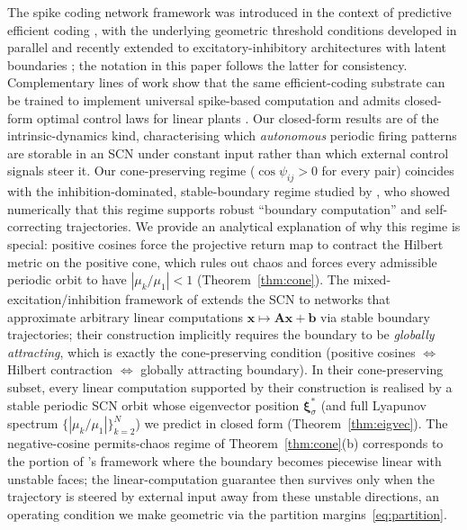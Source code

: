 \documentclass[12pt]{article}
\newcommand{\vv}[1]{\mathbf{#1}}
\newcommand{\xx}{\vv{x}}
\newcommand{\xxi}{\boldsymbol{\xi}}
\begin{document}
 The spike coding network framework was introduced in the context of predictive efficient coding \citep{boerlin2011spike,boerlin2013predictive,deneve2016efficient}, with the underlying geometric threshold conditions developed in parallel \citep{barrett2013firing,chalk2016neural} and recently extended to excitatory-inhibitory architectures with latent boundaries \citep{podlaski2024approximating}; the notation in this paper follows the latter for consistency. Complementary lines of work show that the same efficient-coding substrate can be trained to implement universal spike-based computation \citep{thalmeier2016spikes} and admits closed-form optimal control laws for linear plants \citep{slijkhuis2024closedform}. Our closed-form results are of the intrinsic-dynamics kind, characterising which \emph{autonomous} periodic firing patterns are storable in an SCN under constant input rather than which external control signals steer it. Our cone-preserving regime ($\cos\psi_{ij}>0$ for every pair) coincides with the inhibition-dominated, stable-boundary regime studied by \citet{calaim2022geometry}, who showed numerically that this regime supports robust ``boundary computation'' and self-correcting trajectories. We provide an analytical explanation of why this regime is special: positive cosines force the projective return map to contract the Hilbert metric on the positive cone, which rules out chaos and forces every admissible periodic orbit to have $|\mu_k/\mu_1|<1$ (Theorem~\ref{thm:cone}). The mixed-excitation/inhibition framework of \citet{podlaski2024approximating} extends the SCN to networks that approximate arbitrary linear computations $\xx\mapsto\vv{A}\xx + \vv{b}$ via stable boundary trajectories; their construction implicitly requires the boundary to be \emph{globally attracting}, which is exactly the cone-preserving condition (positive cosines $\Leftrightarrow$ Hilbert contraction $\Leftrightarrow$ globally attracting boundary). In their cone-preserving subset, every linear computation supported by their construction is realised by a stable periodic SCN orbit whose eigenvector position $\xxi^*_\sigma$ (and full Lyapunov spectrum $\{|\mu_k/\mu_1|\}_{k=2}^N$) we predict in closed form (Theorem~\ref{thm:eigvec}). The negative-cosine permits-chaos regime of Theorem~\ref{thm:cone}(b) corresponds to the portion of \citet{podlaski2024approximating}'s framework where the boundary becomes piecewise linear with unstable faces; the linear-computation guarantee then survives only when the trajectory is steered by external input away from these unstable directions, an operating condition we make geometric via the partition margins~\eqref{eq:partition}.
\end{document}
